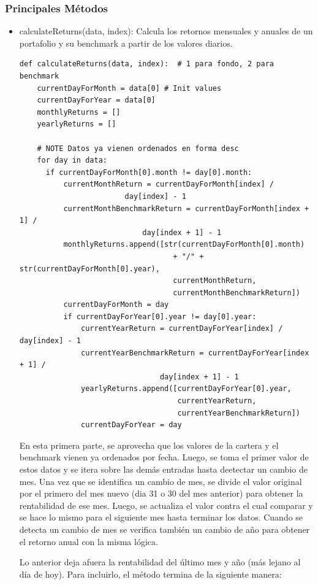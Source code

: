 \documentclass{article}
\begin{document}
\subsubsection{Principales Métodos}
\begin{itemize}
\item calculateReturns(data, index): Calcula los retornos mensuales y anuales de un portafolio y su benchmark a partir de los valores diarios.
\begin{lstlisting}
def calculateReturns(data, index):  # 1 para fondo, 2 para benchmark
    currentDayForMonth = data[0] # Init values
    currentDayForYear = data[0]
    monthlyReturns = []
    yearlyReturns = []

    # NOTE Datos ya vienen ordenados en forma desc
    for day in data:
      if currentDayForMonth[0].month != day[0].month:
          currentMonthReturn = currentDayForMonth[index] /
            			day[index] - 1
          currentMonthBenchmarkReturn = currentDayForMonth[index + 1] /
            				day[index + 1] - 1
          monthlyReturns.append([str(currentDayForMonth[0].month)
                                   + "/" + str(currentDayForMonth[0].year),
                                   currentMonthReturn,
                                   currentMonthBenchmarkReturn])
          currentDayForMonth = day
          if currentDayForYear[0].year != day[0].year:
              currentYearReturn = currentDayForYear[index] / day[index] - 1
              currentYearBenchmarkReturn = currentDayForYear[index + 1] /
              					day[index + 1] - 1
              yearlyReturns.append([currentDayForYear[0].year,
                                    currentYearReturn,
                                    currentYearBenchmarkReturn])
              currentDayForYear = day
\end{lstlisting}

En esta primera parte, se aprovecha que los valores de la cartera y el benchmark vienen ya ordenados por fecha. Luego, se toma el primer valor de estos datos y se itera sobre las demás entradas hasta deetectar un cambio de mes. Una vez que se identifica un cambio de mes, se divide el valor original por el primero del mes nuevo (dia 31 o 30 del mes anterior) para obtener la rentabilidad de ese mes. Luego, se actualiza el valor contra el cual comparar y se hace lo mismo para el siguiente mes hasta terminar los datos. Cuando se detecta un cambio de mes se verifica también un cambio de año para obtener el retorno anual con la misma lógica. 

Lo anterior deja afuera la rentabilidad del último mes y año (más lejano al día de hoy). Para incluirlo, el método termina de la siguiente manera:


\end{itemize}
\end{document}
